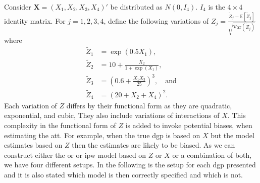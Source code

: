 Consider $\mathbf{X} = (X_1, X_2, X_3, X_4)'$ be distributed as $N(0, I_4)$. $I_4$ is the $4 \times 4$ identity matrix.
For $j = 1, 2, 3, 4$, \citet{kang2007demystifying} define the following variations of $Z_j = \frac{\tilde{Z}_j - \mathbb{E}[\tilde{Z}_j]}{\sqrt{\text{Var}(\tilde{Z}_j)}}$ where
\begin{align} \nonumber
\tilde{Z}_1 &= \exp(0.5X_1), \\ \nonumber
\tilde{Z}_2 &= 10 + \frac{X_2}{1 + \exp(X_1)}, \\
\tilde{Z}_3 &= (0.6 + \frac{X_1 X_3}{25})^3, \quad \text{and} \\ \nonumber
\tilde{Z}_4 &= (20 + X_2 + X_4)^2.  \nonumber
\label{eq:13}
\end{align}
Each variation of $Z$ differs by their functional form as they are quadratic, exponential, and cubic,
They also include variations of interactions of $X$.
This complexity in the functional form of $Z$ is added to invoke potential biases, when estimating the \ac{att}.
For example, when the true \ac{dgp} is based on $X$ but the model estimates based on $Z$ then the estimates are likely to be biased.
As we can construct either the \ac{or} or \ac{ipw} model based on $Z$ or $X$ or a combination of both, we have four different setups.
In the following is the setup for each \ac{dgp} presented and it is also stated which model is then correctly specified and which is not.

